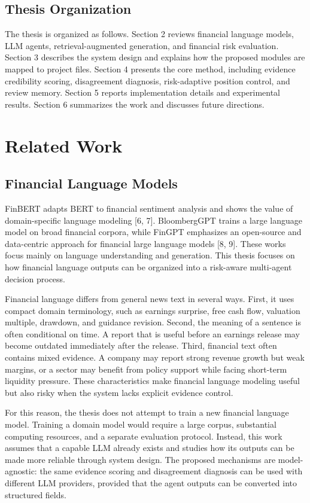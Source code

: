 \documentclass[14pt,a4paper]{extarticle}
\begin{document}
\subsection{Thesis Organization}

The thesis is organized as follows. Section 2 reviews financial language models, LLM agents, retrieval-augmented generation, and financial risk evaluation. Section 3 describes the system design and explains how the proposed modules are mapped to project files. Section 4 presents the core method, including evidence credibility scoring, disagreement diagnosis, risk-adaptive position control, and review memory. Section 5 reports implementation details and experimental results. Section 6 summarizes the work and discusses future directions.

\section{Related Work}

\subsection{Financial Language Models}

FinBERT adapts BERT to financial sentiment analysis and shows the value of domain-specific language modeling [6, 7]. BloombergGPT trains a large language model on broad financial corpora, while FinGPT emphasizes an open-source and data-centric approach for financial large language models [8, 9]. These works focus mainly on language understanding and generation. This thesis focuses on how financial language outputs can be organized into a risk-aware multi-agent decision process.

Financial language differs from general news text in several ways. First, it uses compact domain terminology, such as earnings surprise, free cash flow, valuation multiple, drawdown, and guidance revision. Second, the meaning of a sentence is often conditional on time. A report that is useful before an earnings release may become outdated immediately after the release. Third, financial text often contains mixed evidence. A company may report strong revenue growth but weak margins, or a sector may benefit from policy support while facing short-term liquidity pressure. These characteristics make financial language modeling useful but also risky when the system lacks explicit evidence control.

For this reason, the thesis does not attempt to train a new financial language model. Training a domain model would require a large corpus, substantial computing resources, and a separate evaluation protocol. Instead, this work assumes that a capable LLM already exists and studies how its outputs can be made more reliable through system design. The proposed mechanisms are model-agnostic: the same evidence scoring and disagreement diagnosis can be used with different LLM providers, provided that the agent outputs can be converted into structured fields.
\end{document}
